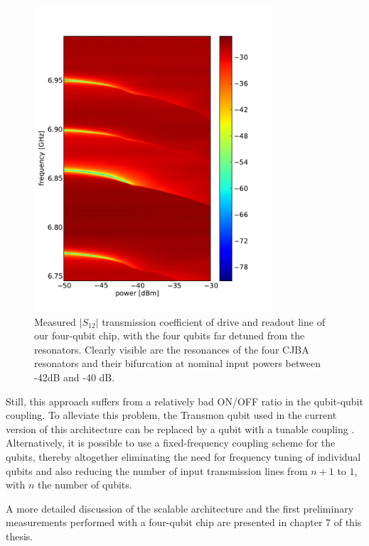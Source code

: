 \begin{figure}
	\centering
	\includegraphics[width=8.8cm]{"./data/scalable architecture/jba spectroscopy/spectro"}
	\caption[Measured $|S_{12}|$ transmission coefficient for the input transmission line of our four-qubit chip]{Measured $|S_{12}|$ transmission coefficient of drive and readout line of our four-qubit chip, with the four qubits far detuned from the resonators. Clearly visible are the resonances of the four CJBA resonators and their bifurcation at nominal input powers between -42dB and -40 dB.}
	\label{fig:jba_multiplexed_spectroscopy}
\end{figure}


Still, this approach suffers from a relatively bad ON/OFF ratio in the qubit-qubit coupling. To alleviate this problem, the Transmon qubit used in the current version of this architecture can be replaced by a qubit with a tunable coupling \citep{srinivasan_tunable_2011}. Alternatively, it is possible to use a fixed-frequency coupling scheme for the qubits, thereby altogether eliminating the need for frequency tuning of individual qubits and also reducing the number of input transmission lines from $n+1$ to $1$, with $n$ the number of qubits.

\smallskip

A more detailed discussion of the scalable architecture and the first preliminary measurements performed with a four-qubit chip are presented in chapter 7 of this thesis.